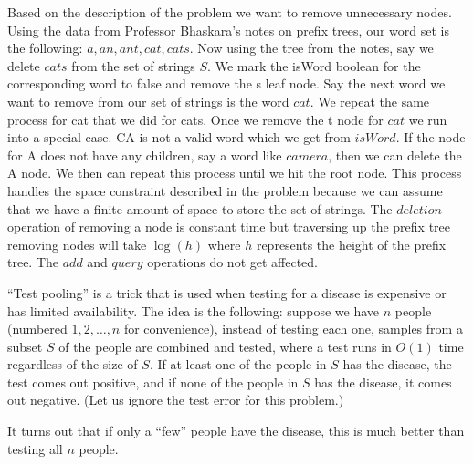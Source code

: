 \documentclass[addpoints, 11pt]{exam}
\begin{document}
\begin{questions}
Based on the description of the problem we want to remove unnecessary nodes. Using the data from Professor Bhaskara's notes on prefix trees, our word set is the following: ${a , an,
ant, cat, cats}$. Now using the tree from the notes, say we delete $cats$ from the set of strings ${S}$. We mark the isWord boolean for the corresponding word to false and remove the s leaf node. Say the next word we want to remove from our set of strings is the word $cat$. We repeat
the same process for cat that we did for cats. Once we remove the t node for $cat$ we run into a special case. CA is not a valid word which we get from $isWord$. If the node for A does not have any children, say a word like $camera$, then we can delete the A node. We then can repeat this process until we hit the root node. This process handles the space constraint described in the problem
because we can assume that we have a finite amount of space to store the set of strings. The $deletion$ operation of removing a node is constant time but traversing up the prefix tree removing nodes will take $\log (h)$ where $h$ represents the height of the prefix tree. The $add$ and $query$ operations do not get affected.

``Test pooling'' is a trick that is used when testing for a disease is expensive or has limited availability. The idea is the following: suppose we have $n$ people (numbered $1, 2, \dots, n$ for convenience), instead of testing each one, samples from a subset $S$ of the people are combined and tested, where a test runs in $O(1)$ time regardless of the size of $S$. If at least one of the people in $S$ has the disease, the test comes out positive, and if none of the people in $S$ has the disease, it comes out negative. (Let us ignore the test error for this problem.)

It turns out that if only a ``few'' people have the disease, this is much better than testing all $n$ people.
\begin{parts}

\end{parts}
\end{questions}
\end{document}
